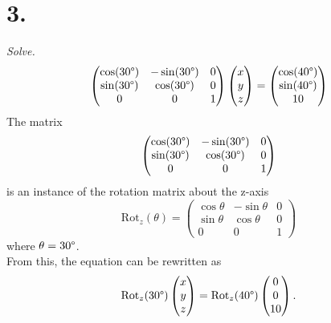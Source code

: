 \documentclass[12pt]{article}
\begin{document}
\section*{3.}
\textit{Solve.}
\begin{equation*}
	\begin{pmatrix}
		\cos(30 \degree) & -\sin(30 \degree) & 0 \\
		\sin(30 \degree) & \cos(30 \degree) & 0 \\
		0 & 0 & 1
	\end{pmatrix}
	\begin{pmatrix}
		x \\
		y \\
		z
	\end{pmatrix}
	=
	\begin{pmatrix}
		\cos(40 \degree) \\
		\sin(40 \degree) \\
		10
	\end{pmatrix}
\end{equation*}
The matrix
\begin{equation*}
	\begin{pmatrix}
		\cos(30 \degree) & -\sin(30 \degree) & 0 \\
		\sin(30 \degree) & \cos(30 \degree) & 0 \\
		0 & 0 & 1
	\end{pmatrix}
\end{equation*}
is an instance of the rotation matrix about the z-axis
\begin{equation*}
	\text{Rot}_z(\theta) =
	\begin{pmatrix}
		\cos \theta & -\sin \theta & 0 \\
		\sin \theta & \cos \theta & 0 \\
		0 & 0 & 1
	\end{pmatrix}
\end{equation*}
where $\theta = 30 \degree$. \\
From this, the equation can be rewritten as
\begin{equation*}
	\text{Rot}_z(30 \degree)
	\begin{pmatrix} x \\ y \\ z \end{pmatrix}
	=
	\text{Rot}_z(40 \degree)
	\begin{pmatrix} 0 \\ 0 \\ 10 \end{pmatrix}
	.
\end{equation*}
\end{document}
